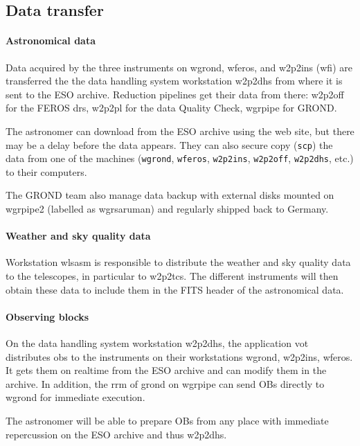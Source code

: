 \documentclass[11pt,fleqn,a4paper]{book}
\begin{document}
\subsection{Data transfer}
\paragraph{Astronomical data}
Data acquired by the three instruments on \gls{wgrond}, \gls{wferos}, and \gls{w2p2ins} (\gls{wfi}) are transferred the the data handling system workstation \gls{w2p2dhs} from where it is sent to the ESO archive.  Reduction pipelines get their data from there: \gls{w2p2off} for the FEROS \gls{drs}, \gls{w2p2pl} for the data Quality Check, \gls{wgrpipe} for GROND.   

The astronomer can download from the ESO archive using the web site, but there may be a delay before the data appears.  They can also secure copy (\texttt{scp}) the data from one of the machines (\texttt{wgrond}, \texttt{wferos}, \texttt{w2p2ins}, \texttt{w2p2off}, \texttt{w2p2dhs}, etc.) to their computers.

The GROND team also manage data backup with external disks mounted on \gls{wgrpipe2} (labelled as \gls{wgrsaruman}) and regularly shipped back to Germany.

\paragraph{Weather and sky quality data}
Workstation \gls{wlsasm} is responsible to distribute the weather and sky quality data to the telescopes, in particular to \gls{w2p2tcs}.  The different instruments will then obtain these data to include them in the FITS header of the astronomical data.

\paragraph{Observing blocks}
On the data handling system workstation \gls{w2p2dhs}, the application \gls{vot} distributes \glspl{ob} to the instruments on their workstations \gls{wgrond}, \gls{w2p2ins}, \gls{wferos}.  It gets them on realtime from the ESO archive and can modify them in the archive. In addition, the \gls{rrm} of \gls{grond} on \gls{wgrpipe} can send OBs directly to \gls{wgrond} for immediate execution.

The astronomer will be able to prepare OBs from any place with immediate repercussion on the ESO archive and thus \gls{w2p2dhs}.
\end{document}
